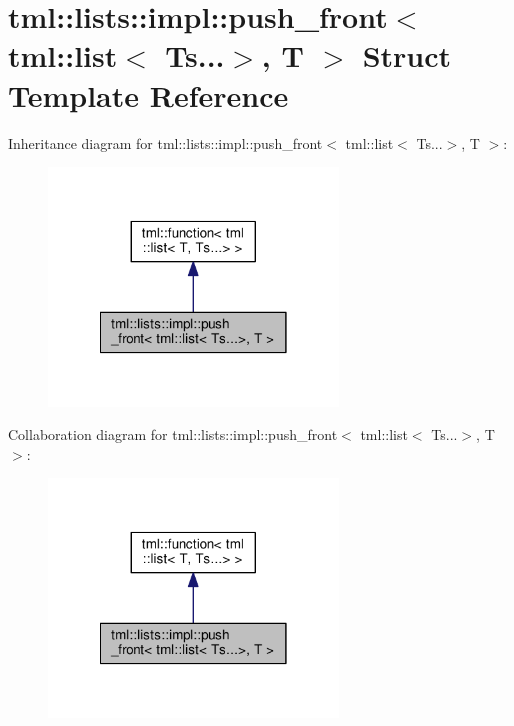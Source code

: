 \hypertarget{structtml_1_1lists_1_1impl_1_1push__front_3_01tml_1_1list_3_01_ts_8_8_8_4_00_01_t_01_4}{\section{tml\+:\+:lists\+:\+:impl\+:\+:push\+\_\+front$<$ tml\+:\+:list$<$ Ts...$>$, T $>$ Struct Template Reference}
\label{structtml_1_1lists_1_1impl_1_1push__front_3_01tml_1_1list_3_01_ts_8_8_8_4_00_01_t_01_4}
}


Inheritance diagram for tml\+:\+:lists\+:\+:impl\+:\+:push\+\_\+front$<$ tml\+:\+:list$<$ Ts...$>$, T $>$\+:
\nopagebreak
\begin{figure}[H]
\begin{center}
\leavevmode
\includegraphics[width=218pt]{structtml_1_1lists_1_1impl_1_1push__front_3_01tml_1_1list_3_01_ts_8_8_8_4_00_01_t_01_4__inherit__graph}
\end{center}
\end{figure}


Collaboration diagram for tml\+:\+:lists\+:\+:impl\+:\+:push\+\_\+front$<$ tml\+:\+:list$<$ Ts...$>$, T $>$\+:
\nopagebreak
\begin{figure}[H]
\begin{center}
\leavevmode
\includegraphics[width=218pt]{structtml_1_1lists_1_1impl_1_1push__front_3_01tml_1_1list_3_01_ts_8_8_8_4_00_01_t_01_4__coll__graph}
\end{center}
\end{figure}
